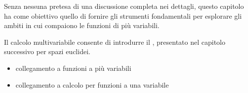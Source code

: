 \documentclass[letterpaper,10pt,italian]{jupyterBook}
\begin{document}
\sphinxAtStartPar
Senza nessuna pretesa di una discussione completa nei dettagli, questo capitolo ha come obiettivo quello di fornire gli strumenti fondamentali per esplorare gli ambiti in cui compaiono le funzioni di più variabili.  

\sphinxAtStartPar
Il calcolo multi\sphinxhyphen{}variabile consente di introdurre il {\hyperref[\detokenize{ch/vector-calculus:vector-calculus}]{}}, presentato nel capitolo successivo per spazi euclidei.

\sphinxAtStartPar
{}
\begin{itemize}
\item {} 
\sphinxAtStartPar
collegamento a funzioni a più variabili

\item {} 
\sphinxAtStartPar
collegamento a calcolo per funzioni a una variabile

\end{itemize}
\end{document}
